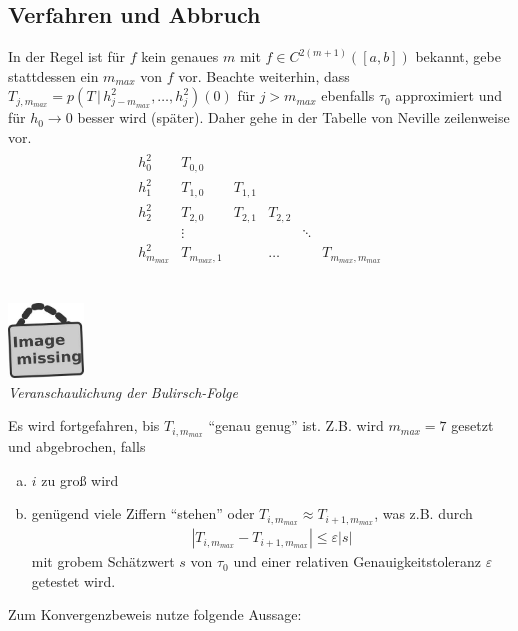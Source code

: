 \documentclass[ngerman,fontsize=11pt, paper=a4, parskip=half, titlepage=true, toc=bib]{scrbook}
\theoremstyle{definition}
\theoremstyle{plain}
\newcommand{\subsectione}[1]{\addtocounter{Def}{1}\subsection{#1}}
\newcommand{\imagemissing}[1]{
  \begin{center}~\\
    \centering 
    \includegraphics[width=2cm]{images/image_missing.jpg}\\
    \textit{#1} \\
  \end{center}
}
\begin{document}
\subsectione{Verfahren und Abbruch}
In der Regel ist für $f$ kein genaues $m$ mit $f\in C^{2(m+1)}([a,b])$
bekannt,
gebe stattdessen ein $m_{max}$ von $f$ vor.
Beachte weiterhin, dass 
$T_{j,m_{max}}=p(T\,|\,h_{j-m_{max}}^2,\ldots,h_j^2)(0)$
für $j>m_{max}$ ebenfalls $\tau_0$ approximiert
und für $h_0\longrightarrow 0$ besser wird (später).
Daher gehe in der Tabelle von Neville zeilenweise vor.
\begin{align*}
  \begin{array}{lccccc}
    h_0^2 & T_{0,0}\\
    h_1^2 & T_{1,0} & T_{1,1}\\
    h_2^2 & T_{2,0} & T_{2,1} & T_{2,2} \\
          & \vdots&&&\ddots\\
    h_{m_{max}}^2 & T_{m_{max},1} &&\ldots && T_{m_{max},m_{max}}
  \end{array}
\end{align*}
\imagemissing{Veranschaulichung der Bulirsch-Folge}
Es wird fortgefahren, bis $T_{i,m_{max}}$ \enquote{genau genug} ist.
Z.B. wird $m_{max}=7$ gesetzt und abgebrochen, falls
\begin{enumerate}[a)]
\item $i$ zu groß wird
\item genügend viele Ziffern \enquote{stehen}
  oder $T_{i,m_{max}}\approx T_{i+1,m_{max}}$,
  was z.B. durch 
  \begin{gather}
    \left| T_{i,m_{max}}-T_{i+1,m_{max}}\right|\leq \varepsilon|s|
    \label{VII.3.20}
  \end{gather}
  mit grobem Schätzwert $s$ von $\tau_0$ und einer relativen
  Genauigkeitstoleranz $\varepsilon$ getestet wird.
\end{enumerate}

Zum Konvergenzbeweis nutze folgende Aussage:
\end{document}
